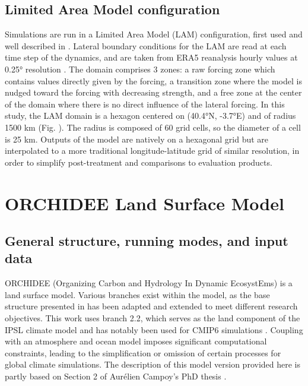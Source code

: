 \subsection{Limited Area Model configuration}
Simulations are run in a Limited Area Model (LAM) configuration, first used and well described in \citet{raillard_leveraging_2024}.
Lateral boundary conditions for the LAM are read at each time step of the dynamics, and are taken from ERA5 reanalysis hourly values at 0.25° resolution \citep{hersbach_era5_2020}.
The domain comprises 3 zones: a raw forcing zone which contains values directly given by the forcing, a transition zone  where the model is nudged toward the forcing with decreasing strength, and a free zone at the center of the domain where there is no direct influence of the lateral forcing.
In this study, the LAM domain is a hexagon centered on (40.4°N, -3.7°E) and of radius 1500 km (Fig. %
). The radius is composed of 60 grid cells, so the diameter of a cell is 25 km. 
Outputs of the model are natively on a hexagonal grid but are interpolated to a more traditional longitude-latitude grid of similar resolution, in order to simplify post-treatment and comparisons to evaluation products.

\section{ORCHIDEE Land Surface Model}
\subsection{General structure, running modes, and input data}
ORCHIDEE (Organizing Carbon and Hydrology In Dynamic EcosystEms) is a land surface model. Various branches exist within the model, as the base structure presented in \citet{krinner_dynamic_2005} has been adapted and extended to meet different research objectives.
This work uses branch 2.2, which serves as the land component of the IPSL climate model and has notably been used for CMIP6 simulations \citep{boucher_presentation_2020}. Coupling with an atmosphere and ocean model imposes significant computational constraints, leading to the simplification or omission of certain processes for global climate simulations.
The description of this model version provided here is partly based on Section 2 of Aurélien Campoy’s PhD thesis \citep{campoy_influence_2013}.

